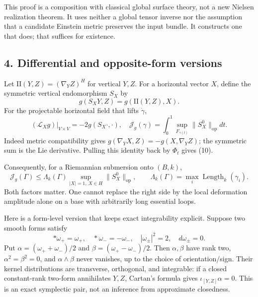 \documentclass[
  11pt,
]{article}
\begin{document}
This proof is a composition with classical global surface theory, not a
new Nielsen realization theorem. It uses neither a global tensor inverse
nor the assumption that a candidate Einstein metric preserves the input
bundle. It constructs one that does; that suffices for existence.

\hypertarget{differential-and-opposite-form-versions}{%
\subsection{4. Differential and opposite-form
versions}\label{differential-and-opposite-form-versions}}

Let \(\mathrm{II}(Y,Z)=(\nabla_YZ)^H\) for vertical \(Y,Z\). For a
horizontal vector \(X\), define the symmetric vertical endomorphism
\(S_X\) by \[
                  g(S_XY,Z)=g(\mathrm{II}(Y,Z),X).
\] For the projectable horizontal field that lifts \(\dot\gamma\), \[
 (\mathcal L_Xg)|_{V\times V}=-2g(S_X\cdot,\cdot),
 \quad
 \mathcal J_g(\gamma)=\int_0^1
               \sup_{F_{\gamma(t)}}\|S_X^0\|_{\mathrm{op}}dt.
\tag{10}
\] Indeed metric compatibility gives \(g(\nabla_YX,Z)=-g(X,\nabla_YZ)\);
the symmetric sum is the Lie derivative. Pulling this identity back by
\(\Phi_t\) gives (10).

Consequently, for a Riemannian submersion onto \((B,k)\), \[
 \mathcal J_g(\Gamma)
 \le\Lambda_k(\Gamma)
       \sup_{|X|=1,\ X\in H}\|S_X^0\|_{\mathrm{op}},
 \qquad \Lambda_k(\Gamma)=\max_i\operatorname{Length}_k(\gamma_i).
\tag{11}
\] Both factors matter. One cannot replace the right side by the local
deformation amplitude alone on a base with arbitrarily long essential
loops.

Here is a form-level version that keeps exact integrability explicit.
Suppose two smooth forms satisfy \[
 *\omega_+=\omega_+,\quad *\omega_-=-\omega_-,\quad
 |\omega_\pm|^2=2,\quad d\omega_\pm=0.
\tag{12}
\] Put \(\alpha=(\omega_++\omega_-)/2\) and
\(\beta=(\omega_+-\omega_-)/2\). Then \(\alpha,\beta\) have rank two,
\(\alpha^2=\beta^2=0\), and \(\alpha\wedge\beta\) never vanishes, up to
the choice of orientation/sign. Their kernel distributions are
transverse, orthogonal, and integrable: if a closed constant-rank
two-form annihilates \(Y,Z\), Cartan's formula gives
\(\iota_{[Y,Z]}\alpha=0\). This is an exact symplectic pair, not an
inference from approximate closedness.
\end{document}
